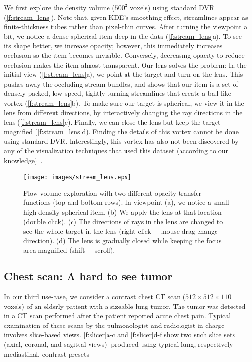 We first explore the density volume ($500^3$ voxels) using standard DVR (\autoref{f:stream_lens}). Note that, given KDE's smoothing effect, streamlines appear as finite-thickness tubes rather than pixel-thin curves. After turning the viewpoint a bit, we notice a dense spherical item deep in the data (\autoref{f:stream_lens}a). To see its shape better, we increase opacity; however, this immediately increases occlusion so the item becomes invisible. Conversely, decreasing opacity to reduce occlusion makes the item almost transparent. Our lens solves the problem: In the initial view (\autoref{f:stream_lens}a), we point at the target and turn on the lens. This pushes away the occluding stream bundles, and shows that our item is a set of densely-packed, low-speed, tightly-turning streamlines that create a ball-like vortex (\autoref{f:stream_lens}b). 
To make sure our target is spherical, we view it in the lens from different directions, by interactively changing the ray directions in the lens (\autoref{f:stream_lens}c). Finally, we can close the lens but keep the target magnified (\autoref{f:stream_lens}d).
Finding the details of this vortex cannot be done using standard DVR. Interestingly, this vortex has also not been discovered by any of the visualization techniques that used this dataset (according to our knowledge) \,\cite{telea_vis_99,griebel2004flow,ddh,lhuillier2017ffteb}. 

\begin{figure}
\centering
\texttt{[image: images/stream\_lens.eps]}

\caption[Flow volume exploration with two different opacity transfer functions (top and bottom rows).]{Flow volume exploration with two different opacity transfer functions (top and bottom rows). In viewpoint (a), we notice a small high-density spherical item. (b) We apply the lens at that location (double click). (c) The directions of rays in the lens are changed to see the whole target in the lens (right click + mouse drag change direction). (d) The lens is gradually closed while keeping the focus area magnified (shift + scroll).}

\label{f:stream_lens}
\end{figure}

\subsection{Chest scan: A hard to see tumor}
\label{sec:chest}
%
In our third use-case, we consider a contrast chest CT scan ($512 \times 512 \times 110$ voxels) of an elderly patient with a sizeable lung tumor. The tumor was detected in a CT scan performed after the patient reported acute chest pain. Typical examination of these scans by the pulmonologist and radiologist in charge involves slice-based views. \autoref{f:slicer}a-c and \autoref{f:slicer}d-f show two such slice sets (axial, coronal, and sagittal views), produced using typical lung, respectively mediastinal, contrast presets.

